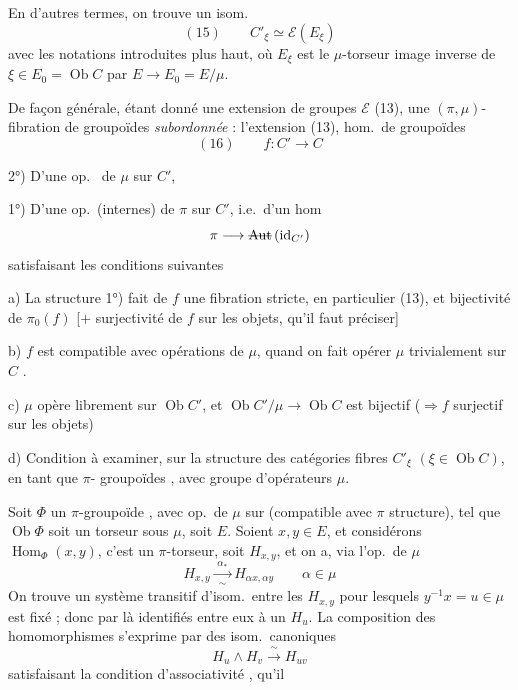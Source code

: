 \documentclass[11pt,a4paper]{article}
\begin{document}
En d'autres termes, on trouve un isom.\ 
\[
  (15) \qquad C'_\xi \simeq \mathcal{E}(E_\xi)
\]
avec les notations introduites plus haut, où $E_\xi$ est le $\mu$-torseur image inverse de
$\xi \in E_0 = \operatorname{Ob} C$ par $E \to E_0 = E/\mu$.

De façon générale, étant donné une extension  de groupes
 $\mathcal{E}$ (13), une \struck{\ill{}} $(\pi, \mu)$-fibration
 de groupoïdes \emph{subordonnée} : l'extension (13), 
 hom.\ de groupoïdes
\[
  (16) \qquad f : C' \longrightarrow C
\]

2°) D'une op.\  de $\mu$ sur $C'$,  

1°) D'une op.\ (internes) de $\pi$ sur $C'$, i.e.\ d'un hom
\[
  \pi \longrightarrow \text{\struck{$\operatorname{Aut}$}}\,(\mathrm{id}_{C'})
\]
satisfaisant les conditions suivantes

a) La structure 1°) fait de $f$ une \add{$\pi$-}fibration stricte, en particulier \ill{}
 \ill{} (13), et bijectivité de $\pi_0(f)$ [$+$ surjectivité de $f$ sur
les objets, qu'il faut préciser]

b) \struck{\ill{}} $f$ est compatible avec opérations de $\mu$, quand on fait opérer $\mu$
trivialement sur $C$ \struck{\ill{}}.

c) $\mu$ opère librement sur $\operatorname{Ob} C'$, et
$\operatorname{Ob} C'/\mu \to \operatorname{Ob} C$ est bijectif ($\Rightarrow f$ surjectif sur
les objets)

d)  Condition à examiner, sur la structure des catégories fibres
$C'_\xi$ $(\xi \in \operatorname{Ob} C)$, en tant que $\pi$- groupoïdes
\struck{\ill{}}, avec groupe d'opérateurs $\mu$.

Soit $\Phi$  un $\pi$-groupoïde , avec op.\ de $\mu$ sur
 (compatible avec $\pi$ structure), tel que $\operatorname{Ob}\Phi$ soit un
torseur sous $\mu$, soit $E$. Soient $x, y \in E$, et considérons
$\operatorname{Hom}_\Phi(x, y)$, c'est un $\pi$-torseur, soit $H_{x,y}$, et on a, via l'op.\
de $\mu$
\[
  H_{x,y} \xrightarrow[\;\sim\;]{\;\alpha_*\;} H_{\alpha x, \alpha y} \qquad \alpha \in \mu
\]
On trouve un système transitif d'isom.\ entre les $H_{x,y}$ pour lesquels
$y^{-1} x = u \in \mu$ est fixé ; donc par là identifiés entre eux à un $H_u$.
\struck{\ill{}} La composition des homomorphismes s'exprime par des isom.\ canoniques
\[
  H_u \wedge H_v \xrightarrow{\;\sim\;} H_{uv}
\]
satisfaisant la condition d'associativité , qu'il
\end{document}
